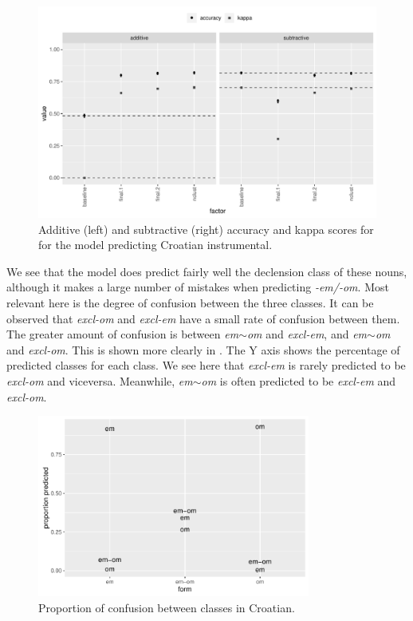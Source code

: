 \begin{figure}
  \centering
  \includegraphics[width=1.0\textwidth]{./figures/croatian/factimp-plot.pdf}
    \caption{Additive (left) and subtractive (right) accuracy and kappa scores for for the model predicting Croatian instrumental.}\label{fig:factimp-plot-croatian}
\end{figure}

We see that the model does predict fairly well the declension class of these nouns, although it makes a large number of mistakes when predicting \textit{-em/-om}. Most relevant here is the degree of confusion between the three classes. It can be observed that \textit{excl-om} and \textit{excl-em} have a small rate of confusion between them. The greater amount of confusion is between \textit{em}$\sim$\textit{om} and \textit{excl-em}, and \textit{em}$\sim$\textit{om} and \textit{excl-om}. This is shown more clearly in . The Y axis shows the percentage of predicted classes for each class. We see here that  \textit{excl-em} is rarely predicted to be  \textit{excl-om} and viceversa. Meanwhile, \textit{em}$\sim$\textit{om} is often predicted to be \textit{excl-em} and \textit{excl-om}.

\begin{figure}
  \centering
  \includegraphics[width=0.8\textwidth]{./figures/croatian/croatian.pdf}
  \caption{Proportion of confusion between classes in Croatian.}\label{fig:croatian-results}
\end{figure}

